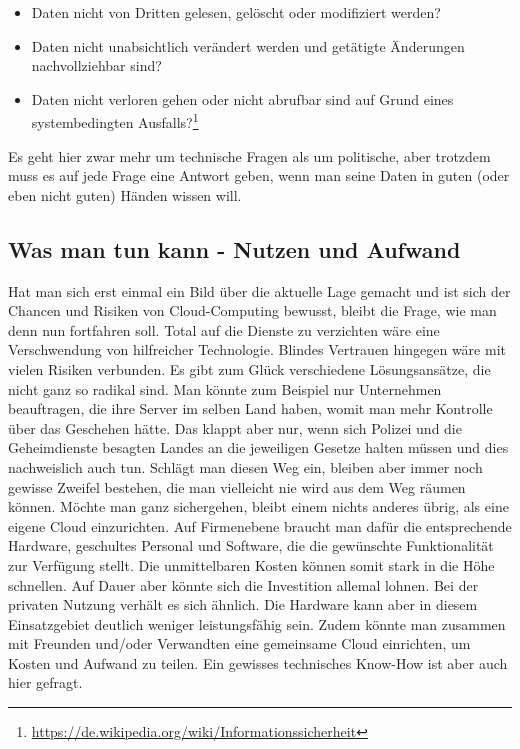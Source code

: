 \begin{itemize}
\item Daten nicht von Dritten gelesen, gelöscht oder modifiziert werden?
\item Daten nicht unabsichtlich verändert werden und getätigte Änderungen nachvollziehbar sind?
\item Daten nicht verloren gehen oder nicht abrufbar sind auf Grund eines systembedingten Ausfalls?\footnote{\url{https://de.wikipedia.org/wiki/Informationssicherheit}}
\end{itemize}

Es geht hier zwar mehr um technische Fragen als um politische, aber trotzdem muss es auf jede Frage eine Antwort geben, wenn man seine Daten in guten (oder eben nicht guten) Händen wissen will.

\subsection{Was man tun kann - Nutzen und Aufwand}
Hat man sich erst einmal ein Bild über die aktuelle Lage gemacht und ist sich der Chancen und Risiken von Cloud-Computing bewusst, bleibt die Frage, wie man denn nun fortfahren soll. Total auf die Dienste zu verzichten wäre eine Verschwendung von hilfreicher Technologie. Blindes Vertrauen hingegen wäre mit vielen Risiken verbunden. Es gibt zum Glück verschiedene Lösungsansätze, die nicht ganz so radikal sind. Man könnte zum Beispiel nur Unternehmen beauftragen, die ihre Server im selben Land haben, womit man mehr Kontrolle über das Geschehen hätte. Das klappt aber nur, wenn sich Polizei und die Geheimdienste besagten Landes an die jeweiligen Gesetze halten müssen und dies nachweislich auch tun. Schlägt man diesen Weg ein, bleiben aber immer noch gewisse Zweifel bestehen, die man vielleicht nie wird aus dem Weg räumen können. Möchte man ganz sichergehen, bleibt einem nichts anderes übrig, als eine eigene Cloud einzurichten. Auf Firmenebene braucht man dafür die entsprechende Hardware, geschultes Personal und  Software, die die gewünschte Funktionalität zur Verfügung stellt. Die unmittelbaren Kosten können somit stark in die Höhe schnellen. Auf Dauer aber könnte sich die Investition allemal lohnen. Bei der privaten Nutzung verhält es sich ähnlich. Die Hardware kann aber in diesem Einsatzgebiet deutlich weniger leistungsfähig sein. Zudem könnte man zusammen mit Freunden und/oder Verwandten eine gemeinsame Cloud einrichten, um Kosten und Aufwand zu teilen. Ein gewisses technisches Know-How ist aber auch hier gefragt.

